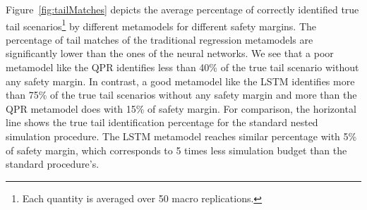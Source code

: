 \documentclass{article}
\begin{document}
Figure~\ref{fig:tailMatches} depicts the average percentage of correctly identified true tail scenarios\footnote{Each quantity is averaged over 50 macro replications.}  by different metamodels for different safety margins.
The percentage of tail matches of the traditional regression metamodels are significantly lower than the ones of the neural networks.
We see that a poor metamodel like the QPR identifies less than 40\% of the true tail scenario without any safety margin.
In contrast, a good metamodel like the LSTM identifies more than 75\% of the true tail scenarios without any safety margin and more than the QPR metamodel does with 15\% of safety margin.
For comparison, the horizontal line shows the true tail identification percentage for the standard nested simulation procedure.
The LSTM metamodel reaches similar percentage with 5\% of safety margin, which corresponds to 5 times less simulation budget than the standard procedure's.
\end{document}

